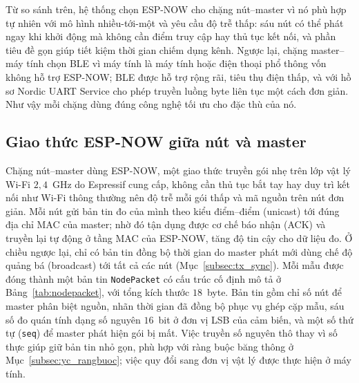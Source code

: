 \documentclass[../DoAn.tex]{subfiles}
\begin{document}
Từ so sánh trên, hệ thống chọn ESP-NOW cho chặng nút--master vì nó phù hợp tự
nhiên với mô hình nhiều-tới-một và yêu cầu độ trễ thấp: sáu nút có thể phát ngay
khi khởi động mà không cần điểm truy cập hay thủ tục kết nối, và phần tiêu đề gọn
giúp tiết kiệm thời gian chiếm dụng kênh. Ngược lại, chặng master--máy tính chọn
BLE vì máy tính là máy tính hoặc điện thoại phổ thông vốn không hỗ trợ ESP-NOW;
BLE được hỗ trợ rộng rãi, tiêu thụ điện thấp, và với hồ sơ Nordic UART Service
cho phép truyền luồng byte liên tục một cách đơn giản. Như vậy mỗi chặng dùng
đúng công nghệ tối ưu cho đặc thù của nó.

\subsection{Giao thức ESP-NOW giữa nút và master}
\label{subsec:tx_espnow}
Chặng nút--master dùng ESP-NOW, một giao thức truyền gói nhẹ trên lớp vật lý Wi-Fi $2{,}4$~GHz do Espressif cung cấp, không cần thủ tục bắt tay hay duy trì kết nối như Wi-Fi thông thường nên độ trễ mỗi gói thấp và mã nguồn trên nút đơn giản. Mỗi nút gửi bản tin đo của mình theo kiểu điểm--điểm (unicast) tới đúng địa chỉ MAC của master; nhờ đó tận dụng được cơ chế báo nhận (ACK) và truyền lại tự động ở tầng MAC của ESP-NOW, tăng độ tin cậy cho dữ liệu đo. Ở chiều ngược lại, chỉ có bản tin đồng bộ thời gian do master phát mới dùng chế độ quảng bá (broadcast) tới tất cả các nút (Mục~\ref{subsec:tx_sync}). Mỗi mẫu được đóng thành một bản
tin \texttt{NodePacket} có cấu trúc cố định mô tả ở Bảng~\ref{tab:nodepacket}, với
tổng kích thước $18$~byte. Bản tin gồm chỉ số nút để master phân biệt nguồn, nhãn
thời gian đã đồng bộ phục vụ ghép cặp mẫu, sáu số đo quán tính dạng số nguyên
$16$~bit ở đơn vị LSB của cảm biến, và một số thứ tự (\texttt{seq}) để master phát
hiện gói bị mất. Việc truyền số nguyên thô thay vì số thực giúp giữ bản tin nhỏ
gọn, phù hợp với ràng buộc băng thông ở Mục~\ref{subsec:yc_rangbuoc}; việc quy đổi
sang đơn vị vật lý được thực hiện ở máy tính.
\end{document}
